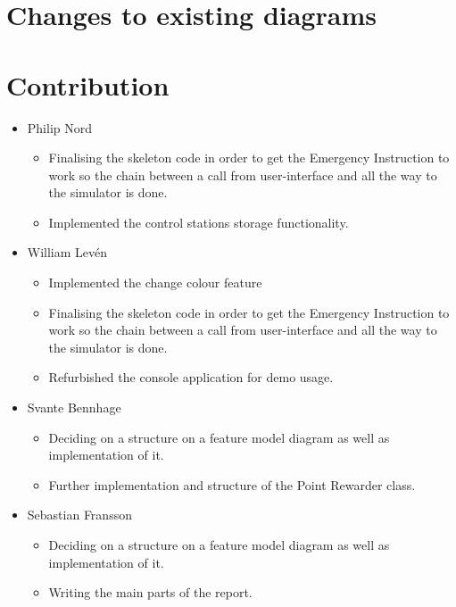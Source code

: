 \section{Changes to existing diagrams}


\section{Contribution}

\begin{itemize}
    \item Philip Nord 
       \begin{itemize}
           \item Finalising the skeleton code in order to get the Emergency Instruction to work so the chain between a call from user-interface and all the way to the simulator is done.
           \item Implemented the control stations storage functionality.
       \end{itemize}
    \item William Lev\'{e}n
       \begin{itemize}
           \item Implemented the change colour feature
           \item Finalising the skeleton code in order to get the Emergency Instruction to work so the chain between a call from user-interface and all the way to the simulator is done.
           \item Refurbished the console application for demo usage.
       \end{itemize}
    \item Svante Bennhage
       \begin{itemize}
           \item Deciding on a structure on a feature model diagram as well as implementation of it.
           \item Further implementation and structure of the Point Rewarder class.
       \end{itemize}
    \item Sebastian Fransson
       \begin{itemize}
           \item Deciding on a structure on a feature model diagram as well as implementation of it.
           \item Writing the main parts of the report.
       \end{itemize}

\end{itemize}
